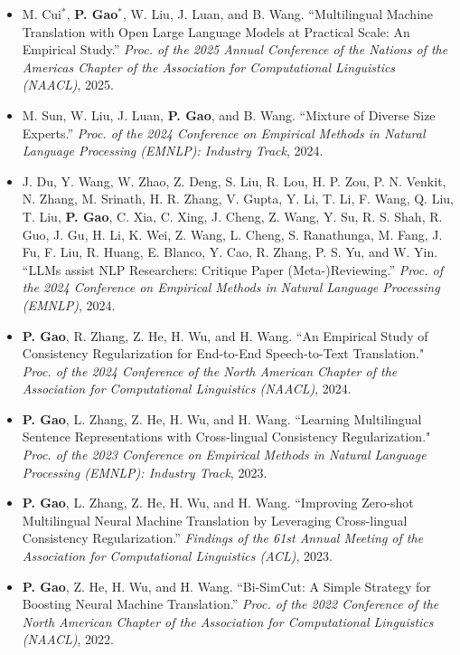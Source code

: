 \documentclass{resume}
\begin{document}
\begin{itemize}[parsep=0.2ex]
\item {M. Cui$^*$, {\bf P. Gao}$^*$, W. Liu, J. Luan, and B. Wang. ``Multilingual Machine Translation with Open Large Language Models at Practical Scale: An Empirical Study.'' \emph{Proc. of the 2025 Annual Conference of the Nations of the Americas Chapter of the Association for Computational Linguistics (NAACL)}, 2025.}

\item {M. Sun, W. Liu, J. Luan, {\bf P. Gao}, and B. Wang. ``Mixture of Diverse Size Experts.'' \emph{Proc. of the 2024 Conference on Empirical Methods in Natural Language Processing (EMNLP): Industry Track}, 2024.}

\item {J. Du, Y. Wang, W. Zhao, Z. Deng, S. Liu, R. Lou, H. P. Zou, P. N. Venkit, N. Zhang, M. Srinath, H. R. Zhang, V. Gupta, Y. Li, T. Li, F. Wang, Q. Liu, T. Liu, {\bf P. Gao}, C. Xia, C. Xing, J. Cheng, Z. Wang, Y. Su, R. S. Shah, R. Guo, J. Gu, H. Li, K. Wei, Z. Wang, L. Cheng, S. Ranathunga, M. Fang, J. Fu, F. Liu, R. Huang, E. Blanco, Y. Cao, R. Zhang, P. S. Yu, and W. Yin. ``LLMs assist NLP Researchers: Critique Paper (Meta-)Reviewing.'' \emph{Proc. of the 2024 Conference on Empirical Methods in Natural Language Processing (EMNLP)}, 2024.}

\item {{\bf P. Gao}, R. Zhang, Z. He, H. Wu, and H. Wang. ``An Empirical Study of Consistency Regularization for End-to-End Speech-to-Text Translation." \emph{Proc. of the 2024 Conference of the North American Chapter of the Association for Computational Linguistics (NAACL)}, 2024.}

\item {{\bf P. Gao}, L. Zhang, Z. He, H. Wu, and H. Wang. ``Learning Multilingual Sentence Representations with Cross-lingual Consistency Regularization." \emph{Proc. of the 2023 Conference on Empirical Methods in Natural Language Processing (EMNLP): Industry Track}, 2023.}

\item {{\bf P. Gao}, L. Zhang, Z. He, H. Wu, and H. Wang. ``Improving Zero-shot Multilingual Neural Machine Translation by Leveraging Cross-lingual Consistency Regularization.'' \emph{Findings of the 61st Annual Meeting of the Association for Computational Linguistics (ACL)}, 2023.}

\item {{\bf P. Gao}, Z. He, H. Wu, and H. Wang. ``Bi-SimCut: A Simple Strategy for Boosting Neural Machine Translation.'' \emph{Proc. of the 2022 Conference of the North American Chapter of the Association for Computational Linguistics (NAACL)}, 2022.}


\end{itemize}
\end{document}
